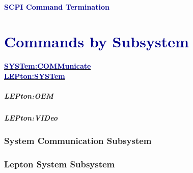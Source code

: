 \documentclass[10pt,a4paper]{article}
\begin{document}
\subsection*{\textcolor{darkblue}{SCPI Command Termination}}

\part*{\textcolor{darkblue}{Commands by Subsystem}}
\begin{spacing}{2}
    \hyperref[sec:SystemCommunicate]{\textbf{\large\textcolor{darkblue}{SYSTem:COMMunicate}}}\\
    \hyperref[sec:LeptonSystem]{\textbf{\large\textcolor{darkblue}{LEPton:SYSTem}}}
\end{spacing}
\subsubsection*{LEPton:OEM}
\subsubsection*{LEPton:VIDeo}

\section*{\label{sec:SystemCommunicate}System Communication Subsystem}
\section*{\label{sec:LeptonSystem}Lepton System Subsystem}
\end{document}
